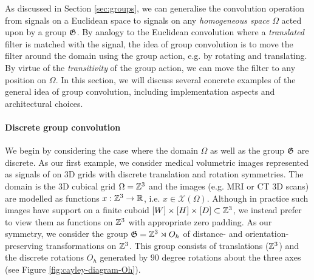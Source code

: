 As discussed in Section \ref{sec:groups}, we can generalise the convolution operation from signals on a Euclidean space to signals on any \emph{homogeneous space} $\Omega$ acted upon by a group ${\mathfrak{G}}$.
By analogy to the Euclidean convolution where a {\em translated} filter is matched with the signal, the idea of group convolution is to move the filter around the domain using the group action, e.g. by rotating and translating. 
By virtue of the \emph{transitivity} of the group action, we can move the filter to any position on $\Omega$.
In this section, we will discuss several concrete examples of the general idea of group convolution, including implementation aspects and architectural choices. 


\paragraph{Discrete group convolution}

We begin by considering the case where the domain $\Omega$ as well as the group ${\mathfrak{G}}$ are discrete.
%
As our first example, we consider medical volumetric images represented as signals of on 3D grids %
with discrete translation and rotation symmetries. %
%
The domain is the 3D cubical grid $\Omega = \mathbb{Z}^3$ and the images (e.g. 
MRI or CT 3D scans) are modelled as functions $x : \mathbb{Z}^3 \rightarrow \mathbb{R}$, i.e. $x \in \mathcal{X}(\Omega)$.
Although in practice such images have support on a finite cuboid $[W] \times [H] \times [D] \subset \mathbb{Z}^3$, we instead prefer to view them as functions on $\mathbb{Z}^3$ with appropriate zero padding. 
%
As our symmetry, we consider the group ${\mathfrak{G}} = \mathbb{Z}^3 \rtimes O_h$ of distance- and orientation-preserving transformations on $\mathbb{Z}^3$.
This group consists of translations ($\mathbb{Z}^3$) and the discrete rotations $O_h$ generated by $90$ degree rotations about the three axes (see Figure \ref{fig:cayley-diagram-Oh}).

